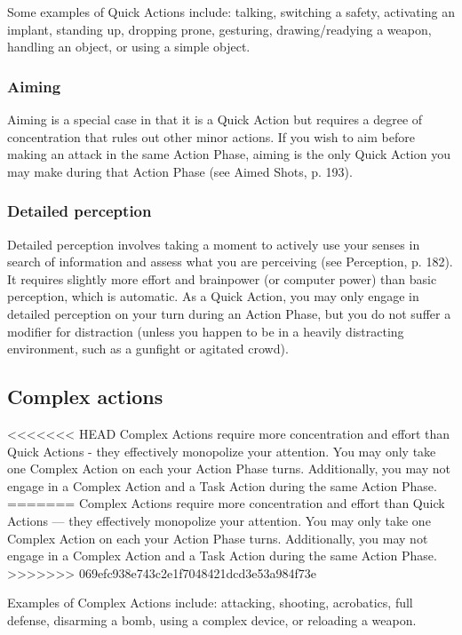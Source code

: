 Some examples of Quick Actions include: talking, switching a safety, activating an implant, standing up, dropping prone, gesturing, drawing/readying a weapon, handling an object, or using a simple object.


\subsubsection{Aiming}

Aiming is a special case in that it is a Quick Action but requires a degree of concentration that rules out other minor actions. If you wish to aim before making an attack in the same Action Phase, aiming is the only Quick Action you may make during that Action Phase (see Aimed Shots, p. 193).

\subsubsection{Detailed perception}

Detailed perception involves taking a moment to actively use your senses in search of information and assess what you are perceiving (see Perception, p. 182). It requires slightly more effort and brainpower (or computer power) than basic perception, which is automatic. As a Quick Action, you may only engage in detailed perception on your turn during an Action Phase, but you do not suffer a modifier for distraction (unless you happen to be in a heavily distracting environment, such as a gunfight or agitated crowd).


\subsection{Complex actions}
\label{sec:combat-complex-actions}

<<<<<<< HEAD
Complex Actions require more concentration and effort than Quick Actions - they effectively monopolize your attention. You may only take one Complex Action on each your Action Phase turns. Additionally, you may not engage in a Complex Action and a Task Action during the same Action Phase.
=======
Complex Actions require more concentration and effort than Quick Actions --- they effectively monopolize your attention. You may only take one Complex Action on each your Action Phase turns. Additionally, you may not engage in a Complex Action and a Task Action during the same Action Phase.
>>>>>>> 069efc938e743c2e1f7048421dcd3e53a984f73e

Examples of Complex Actions include: attacking, shooting, acrobatics, full defense, disarming a bomb, using a complex device, or reloading a weapon.


